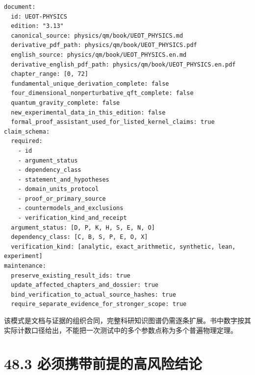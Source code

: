 \documentclass[
  11pt,
  oneside]{book}
\begin{document}
\begin{Verbatim}[breaklines,breakanywhere,fontsize=\scriptsize]
document:
  id: UEOT-PHYSICS
  edition: "3.13"
  canonical_source: physics/qm/book/UEOT_PHYSICS.md
  derivative_pdf_path: physics/qm/book/UEOT_PHYSICS.pdf
  english_source: physics/qm/book/UEOT_PHYSICS.en.md
  derivative_english_pdf_path: physics/qm/book/UEOT_PHYSICS.en.pdf
  chapter_range: [0, 72]
  fundamental_unique_derivation_complete: false
  four_dimensional_nonperturbative_qft_complete: false
  quantum_gravity_complete: false
  new_experimental_data_in_this_edition: false
  formal_proof_assistant_used_for_listed_kernel_claims: true
claim_schema:
  required:
    - id
    - argument_status
    - dependency_class
    - statement_and_hypotheses
    - domain_units_protocol
    - proof_or_primary_source
    - countermodels_and_exclusions
    - verification_kind_and_receipt
  argument_status: [D, P, K, H, S, E, N, O]
  dependency_class: [C, B, S, P, E, O, X]
  verification_kind: [analytic, exact_arithmetic, synthetic, lean, experiment]
maintenance:
  preserve_existing_result_ids: true
  update_affected_chapters_and_dossier: true
  bind_verification_to_actual_source_hashes: true
  require_separate_evidence_for_stronger_scope: true
\end{Verbatim}

该模式是文档与证据的组织合同，完整科研知识图谱仍需逐条扩展。书中数字按其实际计数口径给出，不能把一次测试中的多个参数点称为多个普遍物理定理。

\section{48.3 必须携带前提的高风险结论}
\end{document}
